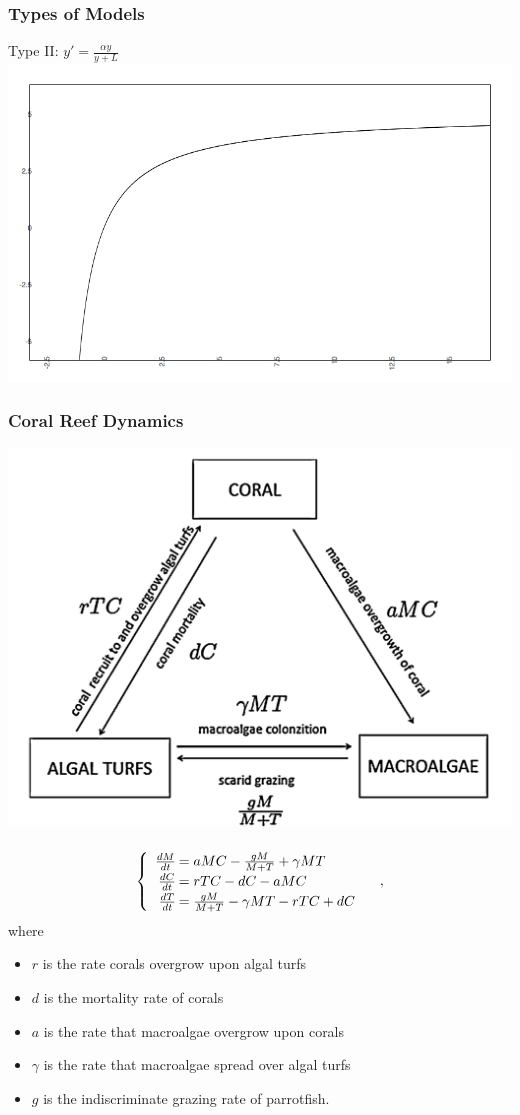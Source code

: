 \begin{frame}
  \frametitle{Types of Models}
    Type II: $y'=\frac{\alpha y}{y+L}$
   \includegraphics[natwidth=162bp, natheight=227bp,width=280bp]{typeII.jpg}
\end{frame}
\begin{frame}
\frametitle{Coral Reef Dynamics}
\includegraphics[natwidth=162bp,natheight=227bp,width=280bp]{./coral-reef-triangle.png}
\end{frame}
\begin{frame}
$$\begin{cases}\begin{array}{rl}
\frac{dM}{dt}\hspace{-.8em}&=aMC - \frac{gM}{M+T}+\gamma M T\\
\frac{dC}{dt}\hspace{-.8em}&=rTC - dC - aMC\\
\frac{dT}{dt}\hspace{-.8em}&=\frac{gM}{M + T} - \gamma MT - rTC + dC
\end{array}\end{cases},$$ where \begin{itemize}\itemsep0pt
\item $r$ is the rate corals overgrow upon algal turfs\\
\item $d$ is the mortality rate of corals\\
\item $a$ is the rate that macroalgae overgrow upon corals\\
\item $\gamma$ is the rate that macroalgae spread over algal turfs\\
\item $g$ is the indiscriminate grazing rate of parrotfish.
\end{itemize}
\end{frame}

